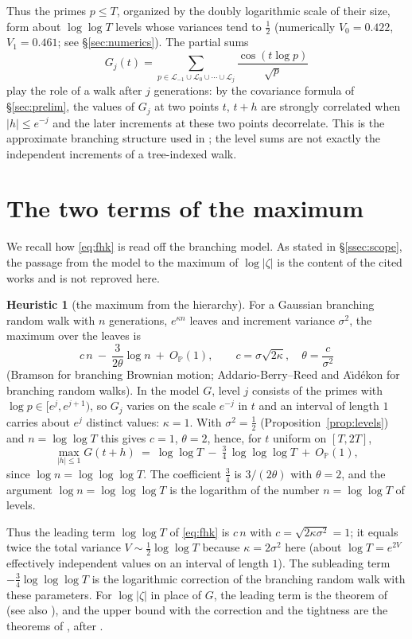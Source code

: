 \documentclass[11pt]{amsart}
\theoremstyle{definition}
\newtheorem{heuristic}[theorem]{Heuristic}
\newcommand{\Pp}{\mathbb P}
\newcommand{\half}{\tfrac12}
\newcommand{\loglog}{\log\log}
\newcommand{\llll}{\log\log\log}
\begin{document}
Thus the primes $p\le T$, organized by the doubly logarithmic scale of their size, form about $\loglog T$ levels
whose variances tend to $\half$ (numerically $V_0=0.422$, $V_1=0.461$; see \S\ref{sec:numerics}). The partial sums
\[
G_j(t)=\sum_{p\in\mathcal L_{-1}\cup\mathcal L_0\cup\cdots\cup\mathcal L_j}\frac{\cos(t\log p)}{\sqrt p}
\]
play the role of a walk after $j$ generations: by the covariance formula of \S\ref{sec:prelim}, the values of
$G_j$ at two points $t$, $t+h$ are strongly correlated when $|h|\le e^{-j}$ and the later increments at these
two points decorrelate. This is the approximate branching structure used in \cite{ABBRS}; the level sums are
not exactly the independent increments of a tree-indexed walk.

\section{The two terms of the maximum}\label{sec:max}

We recall how \eqref{eq:fhk} is read off the branching model. As stated in \S\ref{ssec:scope}, the passage from
the model to the maximum of $\log|\zeta|$ is the content of the cited works and is not reproved here.

\begin{heuristic}[the maximum from the hierarchy]\label{heur:max}
For a Gaussian branching random walk with $n$ generations, $e^{\kappa n}$ leaves and increment variance
$\sigma^2$, the maximum over the leaves is
\[
c\,n\ -\ \frac{3}{2\theta}\log n\ +\ O_{\Pp}(1),\qquad c=\sigma\sqrt{2\kappa},\quad\theta=\frac{c}{\sigma^2}
\]
\textup{(}Bramson \cite{Bramson} for branching Brownian motion; Addario-Berry--Reed \cite{ABReed} and A\"{\i}d\'ekon
\cite{Aidekon} for branching random walks\textup{)}. In the model $G$, level $j$ consists of the primes with
$\log p\in[e^{j},e^{j+1})$, so $G_j$ varies on the scale $e^{-j}$ in $t$ and an interval of length $1$ carries
about $e^{j}$ distinct values: $\kappa=1$. With $\sigma^2=\half$ (Proposition~\ref{prop:levels}) and
$n=\loglog T$ this gives $c=1$, $\theta=2$, hence, for $t$ uniform on $[T,2T]$,
\[
\max_{|h|\le1}G(t+h)\ =\ \loglog T\ -\ \tfrac34\,\llll T\ +\ O_{\Pp}(1),
\]
since $\log n=\llll T$. The coefficient $\tfrac34$ is $3/(2\theta)$ with $\theta=2$, and the argument
$\log n=\llll T$ is the logarithm of the number $n=\loglog T$ of levels.
\end{heuristic}

Thus the leading term $\loglog T$ of \eqref{eq:fhk} is $c\,n$ with $c=\sqrt{2\kappa\sigma^2}=1$; it equals
twice the total variance $V\sim\half\loglog T$ because $\kappa=2\sigma^2$ here (about $\log T=e^{2V}$
effectively independent values on an interval of length $1$). The subleading term $-\tfrac34\llll T$ is the
logarithmic correction of the branching random walk with these parameters. For $\log|\zeta|$ in place of $G$,
the leading term is the theorem of \cite{ABBRS} (see also \cite{Najnudel}), and the upper bound with the
correction and the tightness are the theorems of \cite{ABR1,ABR2}, after \cite{HarperFHK}.
\end{document}
